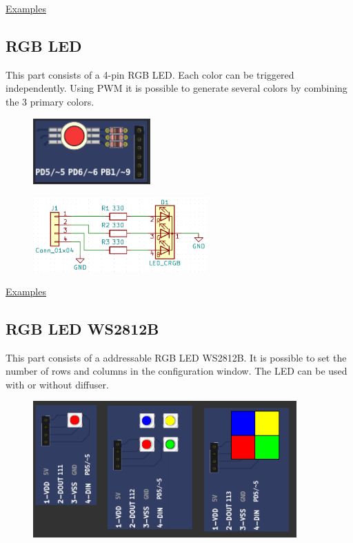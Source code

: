 \href{https://lcgamboa.github.io/picsimlab_examples/parts_LEDs.html}{Examples}
 
\subsection{RGB LED}

This part consists of a 4-pin RGB LED. Each color can be triggered independently.
Using PWM it is possible to generate several colors by combining the 3 primary colors. 
\begin{figure}[H]
\center
\includegraphics[width=0.4\textwidth]{img/part_rgb.png} 
\end{figure} 

\begin{figure}[H]
\center
\includegraphics[width=0.6\textwidth]{img/part_rgb_.png} 
\end{figure} 

\href{https://lcgamboa.github.io/picsimlab_examples/parts_RGB_LED.html}{Examples}


\subsection{RGB LED WS2812B}

This part consists of a addressable RGB LED WS2812B. It is possible to set the number 
of rows and columns in the configuration window. The LED can be used with or without diffuser. 

\begin{figure}[H]
\center
\includegraphics[width=0.9\textwidth]{img/part_led_ws2812b.png} 
\end{figure} 


